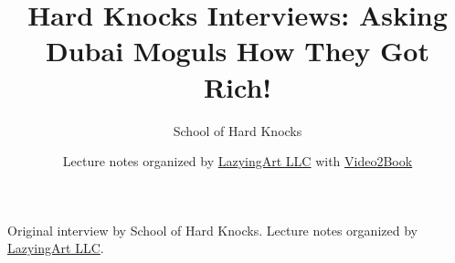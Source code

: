 \documentclass[11pt,oneside]{book}
\begin{document}
\frontmatter
\title{Hard Knocks Interviews: Asking Dubai Moguls How They Got Rich!}
\author{School of Hard Knocks}
\date{Lecture notes organized by \href{https://lazying.art}{LazyingArt LLC} with \href{https://github.com/lachlanchen/Video2Book}{Video2Book}}
\maketitle
\begin{center}
\small Original interview by School of Hard Knocks. Lecture notes organized by \href{https://lazying.art}{LazyingArt LLC}.
\end{center}
\clearpage
\mainmatter

\end{document}
